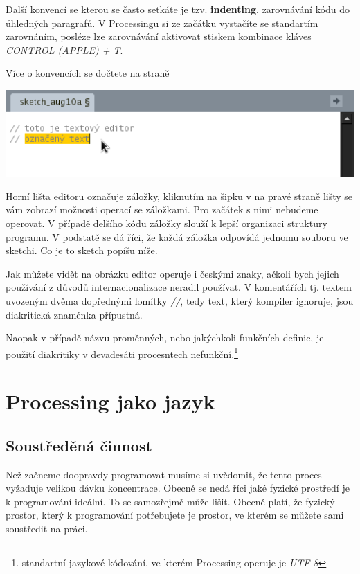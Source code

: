 \documentclass[11pt]{book}
\newcommand{\oddil}[1]{\section{#1}\label{sec:#1}}
\newcommand{\klavesy}[1]{\textsc{\em #1}}
\newcommand{\slovnik}[1]{\textbf{\gls{#1}}\index{#1}}
\begin{document}
Další konvencí se kterou se často setkáte je tzv. \slovnik{indenting}, zarovnávání kódu do úhledných paragrafů. V Processingu si ze začátku vystačíte se standartím zarovnáním, posléze lze zarovnávání aktivovat stiskem kombinace kláves \klavesy{CONTROL (APPLE) + T}.

Více o konvencích se dočtete na straně~\pageref{Předmluva}

\begin{center}
\includegraphics[width = 1\textwidth]{imgs/editor.png}
\end{center}

Horní lišta editoru označuje záložky, kliknutím na šipku v na pravé straně lišty se vám zobrazí možnosti operací se záložkami. Pro začátek s nimi nebudeme operovat. V případě delšího kódu záložky slouží k lepší organizaci struktury programu. V podstatě se dá říci, že každá záložka odpovídá jednomu souboru ve sketchi. Co je to sketch popíšu níže.

Jak můžete vidět na obrázku editor operuje i českými znaky, ačkoli bych jejich používání z důvodů internacionalizace neradil používat. V komentářích tj. textem uvozeným dvěma dopřednými lomítky {\em //}, tedy text, který kompiler ignoruje, jsou diakritická znaménka přípustná.

Naopak v případě názvu proměnných, nebo jakýchkoli funkčních definic, je použití diakritiky v devadesáti procesntech nefunkční.\footnote{standartní jazykové kódování, ve kterém Processing operuje je {\em UTF-8}}




\chapter{Processing jako jazyk}

\oddil{Soustředěná činnost}

Než začneme doopravdy programovat musíme si uvědomit, že tento proces vyžaduje velikou dávku koncentrace. Obecně se nedá říci jaké fyzické prostředí je k programování ideální. To se samozřejmě může lišit. Obecně platí, že fyzický prostor, který k programování potřebujete je prostor, ve kterém se můžete sami soustředit na práci.
\end{document}
